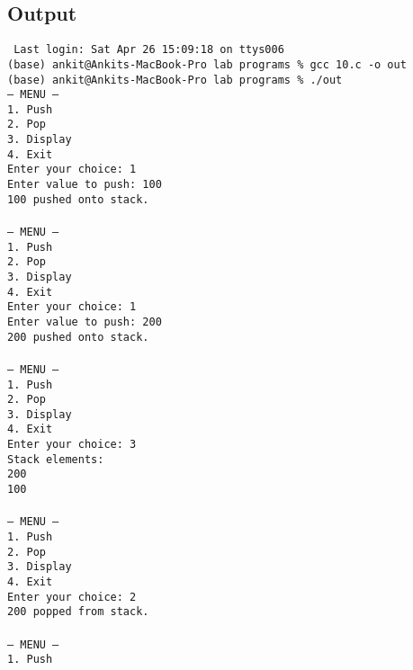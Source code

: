 \documentclass[12pt,a4paper]{article}
\begin{document}
\newpage
\subsection*{Output}
\begin{tcolorbox}[terminalstyle, title=Sample Output]
\texttt{
Last login: Sat Apr 26 15:09:18 on ttys006\\
(base) ankit@Ankits-MacBook-Pro lab programs \% gcc 10.c -o out\\
(base) ankit@Ankits-MacBook-Pro lab programs \% ./out\\
--- MENU ---\\
1. Push\\
2. Pop\\
3. Display\\
4. Exit\\
Enter your choice: 1\\
Enter value to push: 100\\
100 pushed onto stack.\\
\\
--- MENU ---\\
1. Push\\
2. Pop\\
3. Display\\
4. Exit\\
Enter your choice: 1\\
Enter value to push: 200\\
200 pushed onto stack.\\
\\
--- MENU ---\\
1. Push\\
2. Pop\\
3. Display\\
4. Exit\\
Enter your choice: 3\\
Stack elements:\\
200\\
100\\
\\
--- MENU ---\\
1. Push\\
2. Pop\\
3. Display\\
4. Exit\\
Enter your choice: 2\\
200 popped from stack.\\
\\
--- MENU ---\\
1. Push\\
}
\end{tcolorbox}
\end{document}
